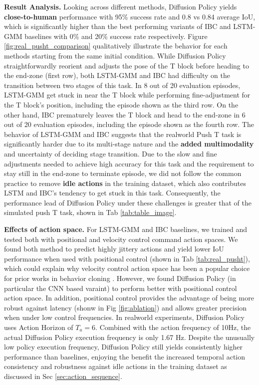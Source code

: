 \textbf{Result Analysis.} Looking across different methods, Diffusion Policy yields \textbf{close-to-human} performance with 95\%  success rate and 0.8 vs 0.84 average IoU, which is significantly higher than the best performing variants of IBC and LSTM-GMM baselines with 0\% and 20\% success rate respectively. Figure \ref{fig:real_pusht_comparison} qualitatively illustrate the behavior for each methods starting from the same initial condition. 
While Diffusion Policy straightforwardly reorient and adjusts the pose of the T block before heading to the end-zone (first row), both LSTM-GMM and IBC had difficulty on the transition between two stages of this task. In 8 out of 20 evaluation episodes, LSTM-GMM get stuck in near the T block while performing fine-adjustment for the T block's position, including the episode shown as the third row. On the other hand, IBC prematurely leaves the T block and head to the end-zone in 6 out of 20 evaluation episodes, including the episode shown as the fourth row. 
The behavior of LSTM-GMM and IBC suggests that the realworld Push T task is significantly harder due to its multi-stage nature and the \textbf{added multimodality} and uncertainty of deciding stage transition. 
Due to the slow and fine adjustments needed to achieve high accuracy for this task and the requirement to stay still in the end-zone to terminate episode, we did not follow the common practice to remove \textbf{idle actions} in the training dataset, which also contributes LSTM and IBC's tendency to get stuck in this task.
Consequently, the performance lead of Diffusion Policy under these challenges is greater that of the simulated push T task, shown in Tab \ref{tab:table_image}. 

\textbf{Effects of action space.} For LSTM-GMM and IBC baselines, we trained and tested both with positional and velocity control command action spaces. We found both method to predict highly jittery actions and yield lower IoU performance when used with positional control (shown in Tab \ref{tab:real_pusht}), which could explain why velocity control action space has been a popular choice for prior works in behavior cloning \cite{ibc,robomimic,bet}. However, we found Diffusion Policy (in particular the CNN based varaint) to perform better with positional control action space. In addition, positional control provides the advantage of being more robust against latency (shonw in Fig \ref{fig:ablation}) and allows greater precision when under low control frequencies. In realworld experiments, Diffusion Policy uses Action Horizon of $T_a=6$. Combined with the action frequency of 10Hz, the actual Diffusion Policy execution frequency is only 1.67 Hz. Despite the unusually low policy execution frequency, Diffusion Policy still yields consistently higher performance than baselines, enjoying the benefit the increased temporal action consistency and robustness against idle actions in the training dataset as discussed in Sec \ref{sec:action_sequence}.

